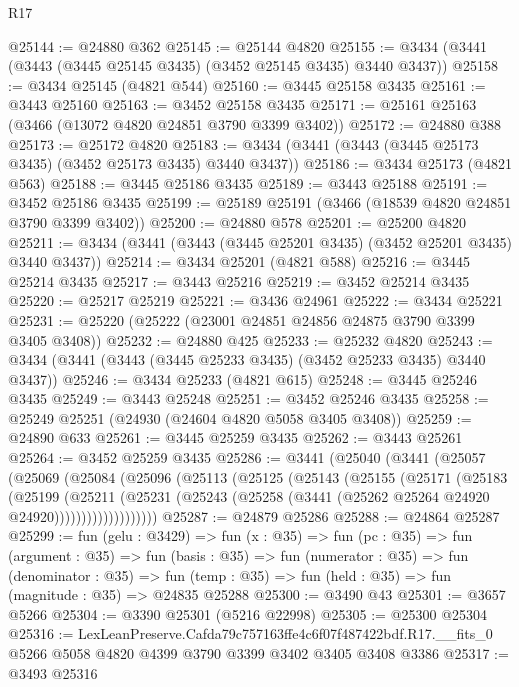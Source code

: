 \begin{lexlean}{R17}
\begin{coremodule}
@25144 := @24880 @362
@25145 := @25144 @4820
@25155 := @3434 (@3441 (@3443 (@3445 @25145 @3435) (@3452 @25145 @3435) @3440 @3437))
@25158 := @3434 @25145 (@4821 @544)
@25160 := @3445 @25158 @3435
@25161 := @3443 @25160
@25163 := @3452 @25158 @3435
@25171 := @25161 @25163 (@3466 (@13072 @4820 @24851 @3790 @3399 @3402))
@25172 := @24880 @388
@25173 := @25172 @4820
@25183 := @3434 (@3441 (@3443 (@3445 @25173 @3435) (@3452 @25173 @3435) @3440 @3437))
@25186 := @3434 @25173 (@4821 @563)
@25188 := @3445 @25186 @3435
@25189 := @3443 @25188
@25191 := @3452 @25186 @3435
@25199 := @25189 @25191 (@3466 (@18539 @4820 @24851 @3790 @3399 @3402))
@25200 := @24880 @578
@25201 := @25200 @4820
@25211 := @3434 (@3441 (@3443 (@3445 @25201 @3435) (@3452 @25201 @3435) @3440 @3437))
@25214 := @3434 @25201 (@4821 @588)
@25216 := @3445 @25214 @3435
@25217 := @3443 @25216
@25219 := @3452 @25214 @3435
@25220 := @25217 @25219
@25221 := @3436 @24961
@25222 := @3434 @25221
@25231 := @25220 (@25222 (@23001 @24851 @24856 @24875 @3790 @3399 @3405 @3408))
@25232 := @24880 @425
@25233 := @25232 @4820
@25243 := @3434 (@3441 (@3443 (@3445 @25233 @3435) (@3452 @25233 @3435) @3440 @3437))
@25246 := @3434 @25233 (@4821 @615)
@25248 := @3445 @25246 @3435
@25249 := @3443 @25248
@25251 := @3452 @25246 @3435
@25258 := @25249 @25251 (@24930 (@24604 @4820 @5058 @3405 @3408))
@25259 := @24890 @633
@25261 := @3445 @25259 @3435
@25262 := @3443 @25261
@25264 := @3452 @25259 @3435
@25286 := @3441
    (@25040
      (@3441
        (@25057
          (@25069
            (@25084
              (@25096
                (@25113
                  (@25125
                    (@25143
                      (@25155
                        (@25171
                          (@25183
                            (@25199
                              (@25211
                                (@25231
                                  (@25243
                                    (@25258 (@3441 (@25262 @25264 @24920 @24920)))))))))))))))))))
@25287 := @24879 @25286
@25288 := @24864 @25287
@25299 := fun (gelu : @3429) =>
  fun (x : @35) =>
  fun (pc : @35) =>
  fun (argument : @35) =>
  fun (basis : @35) =>
  fun (numerator : @35) =>
  fun (denominator : @35) =>
  fun (temp : @35) => fun (held : @35) => fun (magnitude : @35) => @24835 @25288
@25300 := @3490 @43
@25301 := @3657 @5266
@25304 := @3390 @25301 (@5216 @22998)
@25305 := @25300 @25304
@25316 := LexLeanPreserve.Cafda79c757163ffe4c6f07f487422bdf.R17.__fits_0
    @5266
    @5058
    @4820
    @4399
    @3790
    @3399
    @3402
    @3405
    @3408
    @3386
@25317 := @3493 @25316

\end{coremodule}
\end{lexlean}
